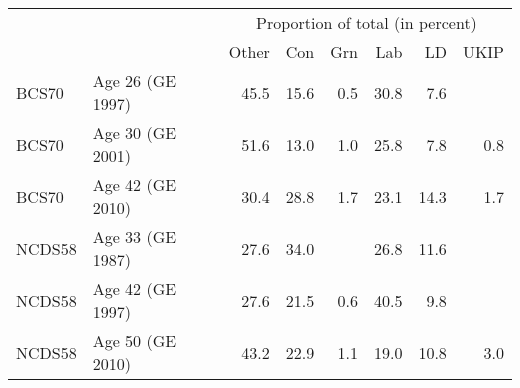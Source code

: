 
\begin{tabular}{llrrrrrr}
\toprule
\multicolumn{1}{c}{} & \multicolumn{1}{c}{} & \multicolumn{6}{c}{Proportion of total (in percent)} \\
\cmidrule(l{3pt}r{3pt}){3-8}
  &   & Other & Con & Grn & Lab & LD & UKIP\\
\midrule
BCS70 & Age 26 (GE 1997) & 45.5 & 15.6 & 0.5 & 30.8 & 7.6 & \\
BCS70 & Age 30 (GE 2001) & 51.6 & 13.0 & 1.0 & 25.8 & 7.8 & 0.8\\
BCS70 & Age 42 (GE 2010) & 30.4 & 28.8 & 1.7 & 23.1 & 14.3 & 1.7\\
\midrule
NCDS58 & Age 33 (GE 1987) & 27.6 & 34.0 &  & 26.8 & 11.6 & \\
NCDS58 & Age 42 (GE 1997) & 27.6 & 21.5 & 0.6 & 40.5 & 9.8 & \\
NCDS58 & Age 50 (GE 2010) & 43.2 & 22.9 & 1.1 & 19.0 & 10.8 & 3.0\\
\bottomrule
\end{tabular}
